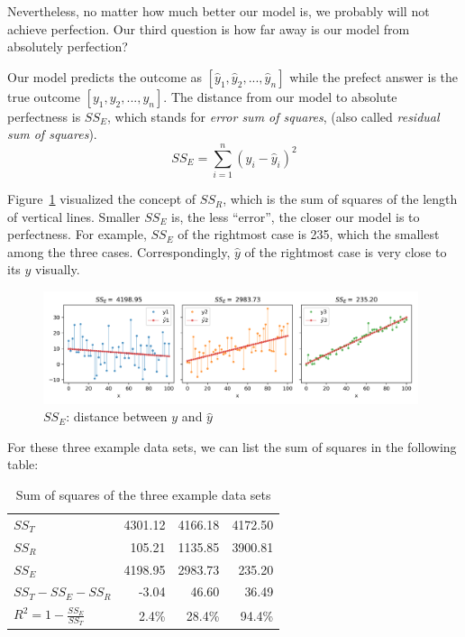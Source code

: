 \documentclass[
	letterpaper
]{article}
\begin{document}
Nevertheless, no matter how much better our model is, we probably will not achieve perfection. 
Our third question is how far away is our model from absolutely perfection?

Our model predicts the outcome as $[\hat y_1, \hat y_2, ..., \hat y_n]$ while the prefect answer is the true outcome $[y_1, y_2, ..., y_n]$.
The distance from our model to absolute perfectness is $SS_E$, which stands for \textit{error sum of squares}, (also called \textit{residual sum of squares}). 
\begin{equation}
SS_E = \sum_{i = 1}^n (y_i - \hat y_i) ^2 
\end{equation}

Figure~\ref{fig:sse} visualized the concept of $SS_R$, which is the sum of squares of the length of vertical lines.
Smaller $SS_E$ is, the less ``error'', the closer our model is to perfectness.
For example, $SS_E$ of the rightmost case is 235, which the smallest among the three cases.
Correspondingly, $\hat y$ of the rightmost case is very close to its $y$ visually.
\begin{figure}[htbp]
	\centering
	\includegraphics[width=0.98\textwidth]{figures/comparison-sse.png}
	\caption{$SS_E$: distance between $y$ and $\hat y$}
	\label{fig:sse}
\end{figure}

For these three example data sets, we can list the sum of squares in the following table:
\begin{table}[htbp]
	\small 
	\centering 
		\caption{Sum of squares of the three example data sets}
		\label{table:ss}
	\begin{tabular}{l | r r r}
$SS_T$										&		4301.12	&		4166.18		&	  4172.50\\
$SS_R$										&   105.21	&		1135.85		&  3900.81\\
$SS_E$										&		4198.95	&		2983.73		&  235.20\\
$SS_T - SS_E - SS_R$		&		-3.04	& 	46.60		&  36.49\\
$R^2 = 1-\frac{SS_E}{SS_T}$			&		2.4\%	&		28.4\%		&  94.4\%\\
	\end{tabular}
 \end{table}
\end{document}
